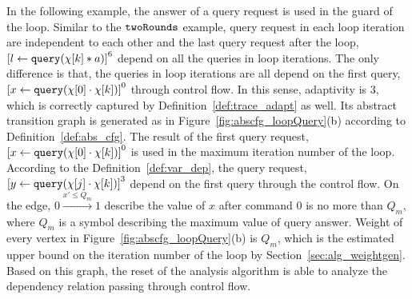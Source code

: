 In the following example, the answer of a query request is used in the guard of the loop.
Similar to the $\mathtt{twoRounds}$ example, query request in each loop iteration are independent to each other and the
last query request after the loop, $\clabel{\assign{l}{\query(\chi[k]*a)} }^{6}$ depend on all the queries in loop iterations.
The only difference is that, the queries in loop iterations are all depend on the first query, $ \clabel{ \assign{x}{\query(\chi[0] \cdot \chi[k])}}^{0}$ through control flow.
In this sense, adaptivity is $3$, which is correctly captured by Definition~\ref{def:trace_adapt} as well.
Its abstract transition graph is generated as in Figure~\ref{fig:abscfg_loopQuery}(b) according to Definition~\ref{def:abs_cfg}.
The result of the first query request, 
$\clabel{ \assign{x}{\query(\chi[0] \cdot \chi[k])}}^{0}$ is used in the maximum iteration number of the loop.
According to the Definition~\ref{def:var_dep}, the query request, $\clabel{\assign{y}{\query(\chi[j] \cdot \chi[k])} }^{3}$ 
depend on the first query through the control flow.
On the edge, $0 \xrightarrow{x' \leq Q_m} 1$ describe the value of $x$ after command $0$ is no more than $Q_m$, where $Q_m$ is
a symbol describing the maximum value of query answer.
Weight of every vertex in Figure~\ref{fig:abscfg_loopQuery}(b) is $Q_m$, which is the estimated upper bound on the iteration number of the loop by Section~\ref{sec:alg_weightgen}.
Based on this graph, the reset of the analysis algorithm is able to analyze the dependency relation passing through control flow.
